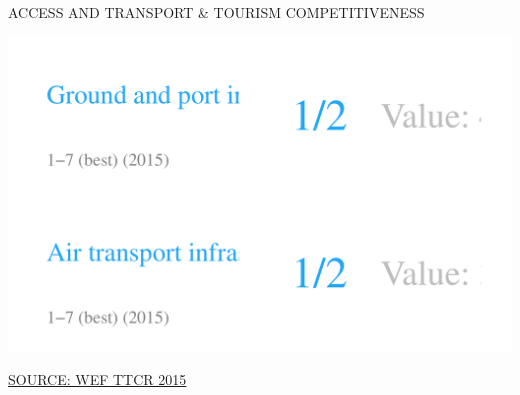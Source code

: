 \documentclass{article}\usepackage[]{graphicx}\usepackage[]{color}
\makeatletter
\def\maxwidth{ %
  \ifdim\Gin@nat@width>\linewidth
    \linewidth
  \else
    \Gin@nat@width
  \fi
}
\newenvironment{kframe}{%
 \def\at@end@of@kframe{}%
 \ifinner\ifhmode%
  \def\at@end@of@kframe{\end{minipage}}%
  \begin{minipage}{\columnwidth}%
 \fi\fi%
 \def\FrameCommand##1{\hskip\@totalleftmargin \hskip-\fboxsep
 \colorbox{shadecolor}{##1}\hskip-\fboxsep
     \hskip-\linewidth \hskip-\@totalleftmargin \hskip\columnwidth}%
 \MakeFramed {\advance\hsize-\width
   \@totalleftmargin\z@ \linewidth\hsize
   \@setminipage}}%
 {\par\unskip\endMakeFramed%
 \at@end@of@kframe}
\makeatother
\begin{document}
\begin{minipage}[c]{0.95\textwidth}
  \vspace{5ex}
  \begin{flushleft}  
    \hspace{4ex}\Large{\textcolor[HTML]{FF4023}{ACCESS AND TRANSPORT \& TOURISM COMPETITIVENESS}}\hspace{2ex}\small{\textcolor[HTML]{818181}{}}
  \end{flushleft}
  \begin{minipage}[c]{0.45\textwidth}
    \hspace{4ex}\small{\textcolor[HTML]{818181}{}}
    \vspace{1ex}


\hfill{}\includegraphics[width=\maxwidth]{figure/number4_1-1} 



    \hspace{4ex}\scriptsize{\href{NA}{\textcolor[HTML]{FF4023}{SOURCE: WEF TTCR 2015}}}
  \end{minipage}  
  \begin{minipage}[c]{0.55\textwidth}
    \hspace{4ex}\small{\textcolor[HTML]{818181}{}}
    \vspace{1ex}
\begin{kframe}


{\ttfamily\noindent\bfseries\color{errorcolor}{\#\# Error in data.frame(..., check.names = FALSE): arguments imply differing number of rows: 11, 6}}\end{kframe}
  \hspace{4ex}\scriptsize{\href{NA}{\textcolor[HTML]{FF4023}{}}}
  \end{minipage}
\end{minipage}
\end{document}
